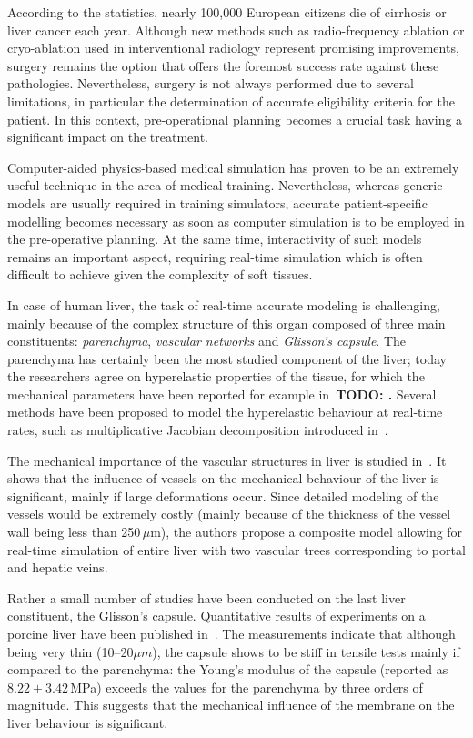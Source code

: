 \documentclass{llncs}
\newcommand{\TODO}[1]{{\color{red}\textbf{TODO: #1}}}
\begin{document}
According to the statistics, nearly 100,000 European citizens die of cirrhosis or liver cancer each year. 
Although new methods such as radio-frequency ablation or cryo-ablation used in interventional radiology 
represent promising improvements, surgery remains the option that offers the foremost success rate against these pathologies. 
Nevertheless, surgery is not always performed due to several limitations, in particular the determination 
of accurate eligibility criteria for the patient. 
In this context, pre-operational planning becomes a crucial task having a significant impact on the treatment. 

Computer-aided physics-based medical simulation has proven to be an extremely useful technique in the area of medical training. 
Nevertheless, whereas generic models are usually required in training simulators, accurate patient-specific modelling
becomes necessary as soon as computer simulation is to be employed in the pre-operative planning. At the same time, 
interactivity of such models  remains an important aspect, requiring real-time simulation which is often difficult to 
achieve given the complexity of soft tissues. 

In case of human liver, the task of real-time accurate modeling is challenging, mainly because of the complex structure 
of this organ composed of three main constituents: \emph{parenchyma}, \emph{vascular networks} and \emph{Glisson's capsule}.
The parenchyma has certainly been the most studied component of the liver; today the researchers agree on hyperelastic 
properties of the tissue, for which the mechanical parameters have been reported for example in~\cite{}\TODO. 
Several methods have been proposed to model the hyperelastic behaviour at real-time rates, such as multiplicative Jacobian decomposition
introduced in~\cite{Marchesseau2010}.

The mechanical importance of the vascular structures in liver is studied in~\cite{Peterlik2012}. It shows that the 
influence of vessels on the mechanical behaviour of the liver is significant, mainly if large deformations occur. 
Since detailed modeling of the vessels would be extremely costly (mainly because of the thickness of the vessel wall 
being less than 250\,{$\mu$}m), the authors propose a composite model allowing for real-time simulation of entire liver
with two vascular trees corresponding to portal and hepatic veins.

Rather a small number of studies have been conducted on the last liver constituent, the  Glisson's capsule.
Quantitative results of experiments on a porcine liver have been published in~\cite{Umale2013}. The measurements indicate that although being very 
thin (10--20$\mu m$), the capsule shows to be stiff in tensile tests mainly if compared to the parenchyma: the Young's modulus of the capsule (reported as $8.22\pm3.42$\,MPa) exceeds the values for the parenchyma by three orders of magnitude.
This suggests that the mechanical influence of the membrane on the liver behaviour is significant.
\end{document}
